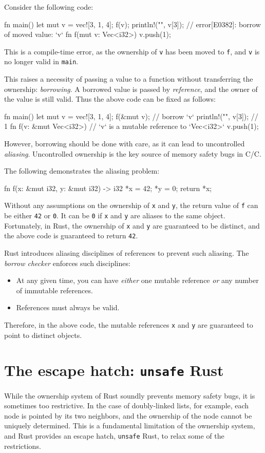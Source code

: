 \documentclass[en]{snu-ece-bsc-thesis}
\theoremstyle{definition}
\def\cplus{\raisebox{.4ex}{\relsize{-3}{\texttt{+}}}}
\def\C++{C\nolinebreak\hspace{-.081em}\cplus\nolinebreak\hspace{-0.02em}\cplus}
\begin{document}
Consider the following code:
\begin{rscode}
fn main() {
    let mut v = vec![3, 1, 4];
    f(v);
    println!("{}", v[3]); // error[E0382]: borrow of moved value: `v`
}
fn f(mut v: Vec<i32>) {
    v.push(1);
}
\end{rscode}
This is a compile-time error, as the ownership of \verb/v/ has been moved to \verb/f/, and \verb/v/ is no longer valid in \verb/main/.

This raises a necessity of passing a value to a function without transferring the ownership: \emph{borrowing}.
A borrowed value is passed by \emph{reference}, and the owner of the value is still valid.
Thus the above code can be fixed as follows:
\begin{rscode}
fn main() {
    let mut v = vec![3, 1, 4];
    f(&mut v); // borrow `v`
    println!("{}", v[3]); // 1
}
fn f(v: &mut Vec<i32>) { // `v` is a mutable reference to `Vec<i32>`
    v.push(1);
}
\end{rscode}

However, borrowing should be done with care, as it can lead to uncontrolled \emph{aliasing}.
Uncontrolled ownership is the key source of memory safety bugs in C/\C++{}.

The following demonstrates the aliasing problem:
\begin{rscode}
fn f(x: &mut i32, y: &mut i32) -> i32 {
    *x = 42;
    *y = 0;
    return *x;
}
\end{rscode}
Without any assumptions on the ownership of \verb/x/ and \verb/y/, the return value of \verb/f/ can be either \verb/42/ or \verb/0/.
It can be \verb/0/ if \verb/x/ and \verb/y/ are aliases to the same object.
Fortunately, in Rust, the ownership of \verb/x/ and \verb/y/ are guaranteed to be distinct, and the above code is guaranteed to return \verb/42/.

Rust introduces aliasing disciplines of references to prevent such aliasing.
The \emph{borrow checker} enforces such disciplines:
\begin{itemize}
  \item At any given time, you can have \emph{either} one mutable reference \emph{or} any number of immutable references.
  \item References must always be valid.
\end{itemize}
Therefore, in the above code, the mutable references \verb/x/ and \verb/y/ are guaranteed to point to distinct objects.


\section{The escape hatch: \texttt{unsafe} Rust}
While the ownership system of Rust soundly prevents memory safety bugs, it is sometimes too restrictive.
In the case of doubly-linked lists, for example, each node is pointed by its two neighbors, and the ownership of the node cannot be uniquely determined.
This is a fundamental limitation of the ownership system, and Rust provides an escape hatch, \verb/unsafe/ Rust, to relax some of the restrictions.
\end{document}
